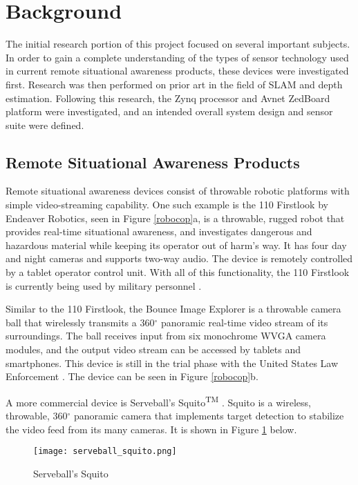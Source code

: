 \section{Background}
The initial research portion of this project focused on several important subjects. In order to gain a complete understanding of the types of sensor technology used in current remote situational awareness products, these devices were investigated first. Research was then performed on prior art in the field of SLAM and depth estimation. Following this research, the Zynq processor and Avnet ZedBoard platform were investigated, and an intended overall system design and sensor suite were defined. 

\subsection{Remote Situational Awareness Products}
Remote situational awareness devices consist of throwable robotic platforms with simple video-streaming capability. One such example is the 110 Firstlook by Endeaver Robotics, seen in Figure \ref{robocop}a, is a throwable, rugged robot that provides real-time situational awareness, and investigates dangerous and hazardous material while keeping its operator out of harm's way. It has four day and night cameras and supports two-way audio. The device is remotely controlled by a tablet operator control unit. With all of this functionality, the 110 Firstlook is currently being used by military personnel \cite{endeavor}.
\par
Similar to the 110 Firstlook, the Bounce Image Explorer is a throwable camera ball that wirelessly transmits a 360$^\circ$ panoramic real-time video stream of its surroundings. The ball receives input from six monochrome WVGA camera modules, and the output video stream can be accessed by tablets and smartphones. This device is still in the trial phase with the United States Law Enforcement \cite{bounceImaging}. The device can be seen in Figure \ref{robocop}b.
\par
A more commercial device is Serveball's Squito\textsuperscript{TM} \cite{serveball}. Squito is a wireless, throwable, 360$^{\circ}$ panoramic camera that implements target detection to stabilize the video feed from its many cameras. It is shown in Figure \ref{squito} below.

\begin{figure}[H]
	\centerline{\texttt{[image: serveball\_squito.png]}}
	\caption{Serveball's Squito \cite{serveball}}
	\label{squito}
\end{figure}

